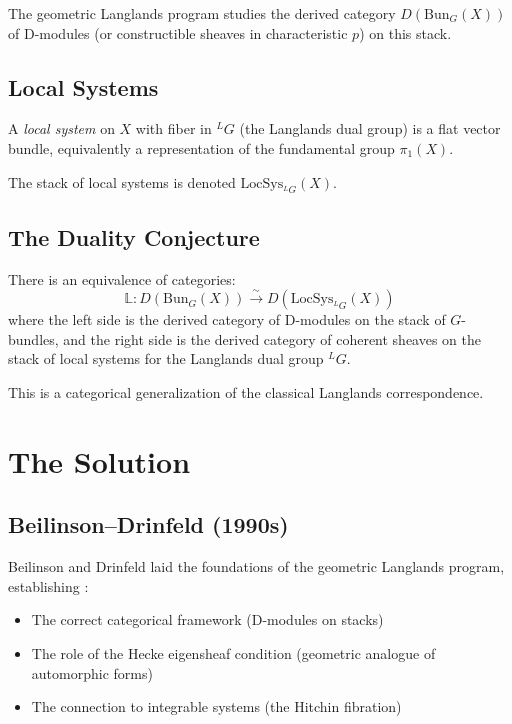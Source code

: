 The geometric Langlands program studies the derived category $D(\text{Bun}_G(X))$ of D-modules (or constructible sheaves in characteristic $p$) on this stack.

\subsection{Local Systems}

\begin{definition}
A \emph{local system} on $X$ with fiber in $^LG$ (the Langlands dual group) is a flat vector bundle, equivalently a representation of the fundamental group $\pi_1(X)$.
\end{definition}

The stack of local systems is denoted $\text{LocSys}_{^LG}(X)$.

\subsection{The Duality Conjecture}

\begin{conjecture}
There is an equivalence of categories:
\begin{equation}
\mathbb{L}: D(\text{Bun}_G(X)) \xrightarrow{\sim} D(\text{LocSys}_{^LG}(X))
\end{equation}
where the left side is the derived category of D-modules on the stack of $G$-bundles, and the right side is the derived category of coherent sheaves on the stack of local systems for the Langlands dual group $^LG$.
\end{conjecture}

This is a categorical generalization of the classical Langlands correspondence.

\section{The Solution}

\subsection{Beilinson--Drinfeld (1990s)}

Beilinson and Drinfeld laid the foundations of the geometric Langlands program, establishing \cite{beilinson2004}:

\begin{itemize}
\item The correct categorical framework (D-modules on stacks)
\item The role of the Hecke eigensheaf condition (geometric analogue of automorphic forms)
\item The connection to integrable systems (the Hitchin fibration)
\end{itemize}

